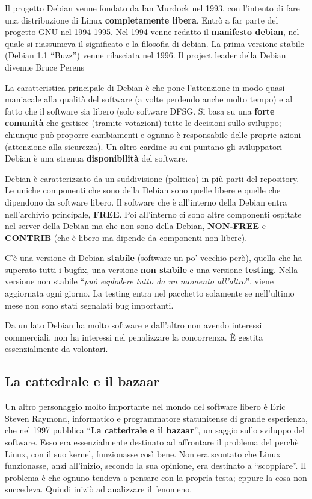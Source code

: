 Il progetto Debian venne fondato da Ian Murdock nel 1993, con l'intento di fare una distribuzione di Linux \textbf{completamente libera}. Entrò a far parte del progetto GNU nel 1994-1995. Nel 1994 venne redatto il \textbf{manifesto debian}, nel quale si riassumeva il significato e la filosofia di debian. La prima versione stabile (Debian 1.1 ``Buzz'') venne rilasciata nel 1996. Il project leader della Debian divenne Bruce Perens

La caratteristica principale di Debian è che pone l'attenzione in modo quasi maniacale alla qualità del software (a volte perdendo anche molto tempo) e al fatto che il software sia libero (solo software DFSG. Si basa su una \textbf{forte comunità} che gestisce (tramite votazioni) tutte le decisioni sullo sviluppo; chiunque può proporre cambiamenti e ognuno è responsabile delle proprie azioni (attenzione alla sicurezza). Un altro cardine su cui puntano gli sviluppatori Debian è una strenua \textbf{disponibilità} del software.

Debian è caratterizzato da un suddivisione (politica) in più parti del repository. Le uniche componenti che sono della Debian sono quelle libere e quelle che dipendono da software libero. Il software che è all'interno della Debian entra nell'archivio principale, \textbf{FREE}. Poi all'interno ci sono altre componenti ospitate nel server della Debian ma che non sono della Debian, \textbf{NON-FREE} e \textbf{CONTRIB} (che è libero ma dipende da componenti non libere).

C'è una versione di Debian \textbf{stabile} (software un po' vecchio però), quella che ha superato tutti i bugfix, una versione \textbf{non stabile} e una versione \textbf{testing}. Nella versione non stabile ``\textit{può esplodere tutto da un momento all'altro}'', viene aggiornata ogni giorno. La testing entra nel pacchetto solamente se nell'ultimo mese non sono stati segnalati bug importanti.

Da un lato Debian ha molto software e dall'altro non avendo interessi commerciali, non ha interessi nel penalizzare la concorrenza. È gestita essenzialmente da volontari.

\subsection{La cattedrale e il bazaar}

Un altro personaggio molto importante nel mondo del software libero è Eric Steven Raymond, informatico e programmatore statunitense di grande esperienza, che nel 1997 pubblica ``\textbf{La cattedrale e il bazaar}'', un saggio sullo sviluppo del software. Esso era essenzialmente destinato ad affrontare il problema del perchè Linux, con il suo kernel, funzionasse così bene. Non era scontato che Linux funzionasse, anzi all'inizio, secondo la sua opinione, era destinato a ``scoppiare''. Il problema è che ognuno tendeva a pensare con la propria testa; eppure la cosa non succedeva. Quindi iniziò ad analizzare il fenomeno. 

